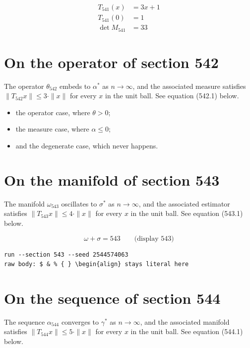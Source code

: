 \documentclass{article}
\begin{document}
\begin{align}
T_{541}(x) &= 3 x + 1 \\
T_{541}(0) &= 1 \\
\det M_{541} &= 33
\end{align}

\section{On the operator of section 542}
The operator $\theta_{542}$ embeds to $\alpha^{*}$ as $n \to \infty$,
and the associated measure satisfies $\|T_{542} x\| \leq 3 \cdot \|x\|$
for every $x$ in the unit ball. See equation (542.1) below.

\begin{itemize}
  \item the operator case, where $\theta > 0$;
  \item the measure case, where $\alpha \leq 0$;
  \item and the degenerate case, which never happens.
\end{itemize}

\section{On the manifold of section 543}
The manifold $\omega_{543}$ oscillates to $\sigma^{*}$ as $n \to \infty$,
and the associated estimator satisfies $\|T_{543} x\| \leq 4 \cdot \|x\|$
for every $x$ in the unit ball. See equation (543.1) below.

$$
\omega + \sigma = 543 \qquad \text{(display 543)}
$$

\begin{verbatim}
run --section 543 --seed 2544574063
raw body: $ & % { } \begin{align} stays literal here
\end{verbatim}

\section{On the sequence of section 544}
The sequence $\alpha_{544}$ converges to $\gamma^{*}$ as $n \to \infty$,
and the associated manifold satisfies $\|T_{544} x\| \leq 5 \cdot \|x\|$
for every $x$ in the unit ball. See equation (544.1) below.
\end{document}
